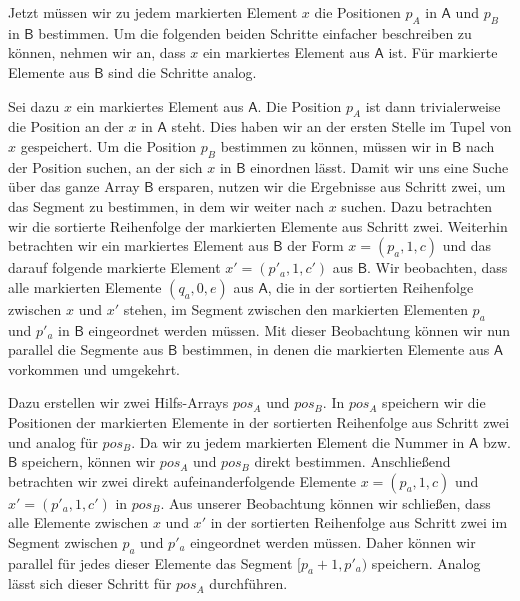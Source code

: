 Jetzt müssen wir zu jedem markierten Element $x$ die Positionen $p_A$ in $\mathsf{A}$ und $p_B$ in $\mathsf{B}$ bestimmen. Um die folgenden beiden Schritte einfacher beschreiben zu können, nehmen wir an, dass $x$ ein markiertes Element aus $\mathsf{A}$ ist. Für markierte Elemente aus $\mathsf{B}$ sind die Schritte analog. \par
Sei dazu $x$ ein markiertes Element aus $\mathsf{A}$. Die Position $p_A$ ist dann trivialerweise die Position an der $x$ in $\mathsf{A}$ steht. Dies haben wir an der ersten Stelle im Tupel von $x$ gespeichert. Um die Position $p_B$ bestimmen zu können, müssen wir in $\mathsf{B}$ nach der Position suchen, an der sich $x$ in $\mathsf{B}$ einordnen lässt. Damit wir uns eine Suche über das ganze Array $\mathsf{B}$ ersparen, nutzen wir die Ergebnisse aus Schritt zwei, um das Segment zu bestimmen, in dem wir weiter nach $x$ suchen. 
Dazu betrachten wir die sortierte Reihenfolge der markierten Elemente aus Schritt zwei. Weiterhin betrachten wir ein markiertes Element aus $\mathsf{B}$ der Form $x = (p_a, 1, c)$ und das darauf folgende markierte Element $x' = (p'_a, 1, c')$ aus $\mathsf{B}$. Wir beobachten, dass alle markierten Elemente $(q_a, 0, e)$ aus $\mathsf{A}$, die in der sortierten Reihenfolge zwischen $x$ und $x'$ stehen, im Segment zwischen den markierten Elementen $p_a$ und $p'_a$ in $\mathsf{B}$ eingeordnet werden müssen. Mit dieser Beobachtung können wir nun parallel die Segmente aus $\mathsf{B}$ bestimmen, in denen die markierten Elemente aus $\mathsf{A}$ vorkommen und umgekehrt. \par
Dazu erstellen wir zwei Hilfs-Arrays $pos_A$ und $pos_B$. In $pos_A$ speichern wir die Positionen der markierten Elemente in der sortierten Reihenfolge aus Schritt zwei und analog für $pos_B$. Da wir zu jedem markierten Element die Nummer in $\mathsf{A}$ bzw. $\mathsf{B}$ speichern, können wir $pos_A$ und $pos_B$ direkt bestimmen. Anschließend betrachten wir zwei direkt aufeinanderfolgende Elemente $x=(p_a, 1, c)$ und $x'=(p'_a, 1, c')$ in $pos_B$. Aus unserer Beobachtung können wir schließen, dass alle Elemente zwischen $x$ und $x'$ in der sortierten Reihenfolge aus Schritt zwei im Segment zwischen $p_a$ und $p'_a$ eingeordnet werden müssen. Daher können wir pa\-ral\-lel für jedes dieser Elemente das Segment $[p_a+1, p'_a)$ speichern. Analog lässt sich dieser Schritt für $pos_A$ durchführen. \par
